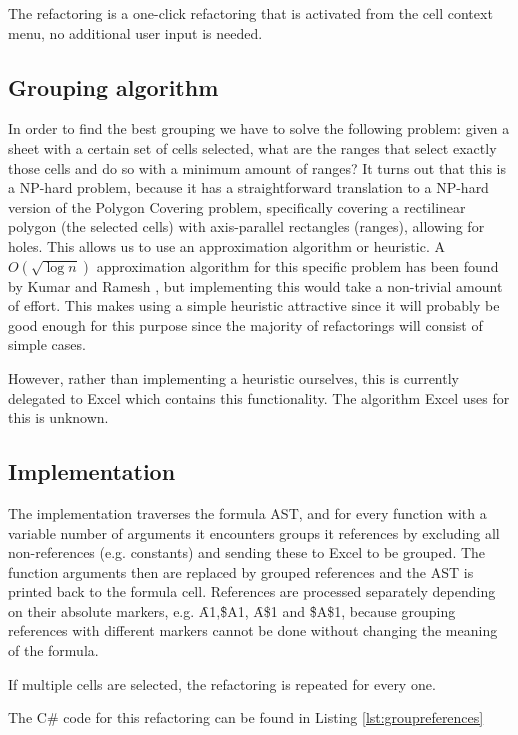 The refactoring is a one-click refactoring that is activated from the cell context menu, no additional user input is needed.

\subsection{Grouping algorithm}

In order to find the best grouping we have to solve the following problem: given a sheet with a certain set of cells selected, what are the ranges that select exactly those cells and do so with a minimum amount of ranges?
It turns out that this is a NP-hard problem, because it has a straightforward translation to a NP-hard version of the Polygon Covering problem, specifically covering a rectilinear polygon (the selected cells) with axis-parallel rectangles (ranges), allowing for holes.
This allows us to use an approximation algorithm or heuristic.
A $O(\sqrt{\log{n}})$ approximation algorithm for this specific problem has been found by Kumar and Ramesh \cite{kumar2003covering}, but implementing this would take a non-trivial amount of effort.
This makes using a simple heuristic attractive since it will probably be good enough for this purpose since the majority of refactorings will consist of simple cases.

However, rather than implementing a heuristic ourselves, this is currently delegated to Excel which contains this functionality.
The algorithm Excel uses for this is unknown.

\subsection{Implementation}

The implementation traverses the formula AST, and for every function with a variable number of arguments it encounters groups it references by excluding all non-references (e.g. constants) and sending these to Excel to be grouped.
The function arguments then are replaced by grouped references and the AST is printed back to the formula cell.
References are processed separately depending on their absolute markers, e.g. \f{A1},\f{\$A1}, \f{A\$1} and \f{\$A\$1}, because grouping references with different markers cannot be done without changing the meaning of the formula.

If multiple cells are selected, the refactoring is repeated for every one.

The C\# code for this refactoring can be found in Listing \ref{lst:groupreferences}

